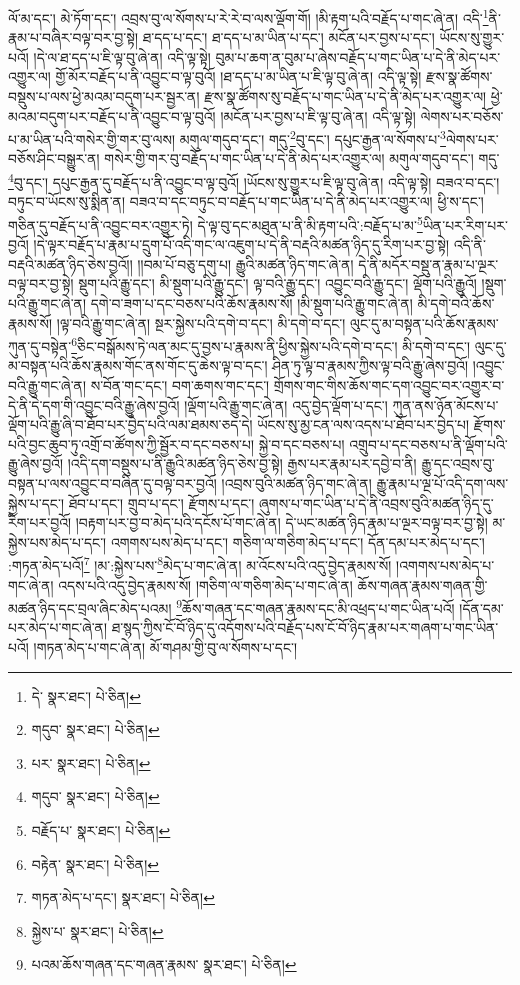 ལོ་མ་དང་། མེ་ཏོག་དང་། འབྲས་བུ་ལ་སོགས་པ་རེ་རེ་བ་ལས་ལྡོག་གོ། །མི་རྟག་པའི་བརྗོད་པ་གང་ཞེ་ན། འདི་\footnote{དེ་  སྣར་ཐང་།  པེ་ཅིན། }ནི་རྣམ་པ་བཞིར་བལྟ་བར་བྱ་སྟེ། ཐ་དད་པ་དང་། ཐ་དད་པ་མ་ཡིན་པ་དང་། མངོན་པར་བྱས་པ་དང་། ཡོངས་སུ་གྱུར་པའོ། །དེ་ལ་ཐ་དད་པ་ཇི་ལྟ་བུ་ཞེ་ན། འདི་ལྟ་སྟེ། བུམ་པ་ཆག་ན་བུམ་པ་ཞེས་བརྗོད་པ་གང་ཡིན་པ་དེ་ནི་མེད་པར་འགྱུར་ལ། གྱོ་མོར་བརྗོད་པ་ནི་འབྱུང་བ་ལྟ་བུའོ། །ཐ་དད་པ་མ་ཡིན་པ་ཇི་ལྟ་བུ་ཞེ་ན། འདི་ལྟ་སྟེ། རྫས་སྣ་ཚོགས་བསྡུས་པ་ལས་ཕྱེ་མའམ་བདུག་པར་སྦྱར་ན། རྫས་སྣ་ཚོགས་སུ་བརྗོད་པ་གང་ཡིན་པ་དེ་ནི་མེད་པར་འགྱུར་ལ། ཕྱེ་མའམ་བདུག་པར་བརྗོད་པ་ནི་འབྱུང་བ་ལྟ་བུའོ། །མངོན་པར་བྱས་པ་ཇི་ལྟ་བུ་ཞེ་ན། འདི་ལྟ་སྟེ། ལེགས་པར་བཅོས་པ་མ་ཡིན་པའི་གསེར་གྱི་གར་བུ་ལས། མགུལ་གདུབ་དང་། གདུ་\footnote{གདུབ་  སྣར་ཐང་།  པེ་ཅིན། }བུ་དང་། དཔུང་རྒྱན་ལ་སོགས་པ་\footnote{པར་  སྣར་ཐང་།  པེ་ཅིན། }ལེགས་པར་བཅོས་ཤིང་བསྒྱུར་ན། གསེར་གྱི་གར་བུ་བརྗོད་པ་གང་ཡིན་པ་དེ་ནི་མེད་པར་འགྱུར་ལ། མགུལ་གདུབ་དང་། གདུ་\footnote{གདུབ་  སྣར་ཐང་།  པེ་ཅིན། }བུ་དང་། དཔུང་རྒྱན་དུ་བརྗོད་པ་ནི་འབྱུང་བ་ལྟ་བུའོ། །ཡོངས་སུ་གྱུར་པ་ཇི་ལྟ་བུ་ཞེ་ན། འདི་ལྟ་སྟེ། བཟའ་བ་དང་། བཏུང་བ་ཡོངས་སུ་སྨིན་ན། བཟའ་བ་དང་བཏུང་བ་བརྗོད་པ་གང་ཡིན་པ་དེ་ནི་མེད་པར་འགྱུར་ལ། ཕྱི་ས་དང་། གཅིན་དུ་བརྗོད་པ་ནི་འབྱུང་བར་འགྱུར་ཏེ། དེ་ལྟ་བུ་དང་མཐུན་པ་ནི་མི་རྟག་པའི་:བརྗོད་པ་མ་\footnote{བརྗོད་པ་  སྣར་ཐང་།  པེ་ཅིན། }ཡིན་པར་རིག་པར་བྱའོ། །དེ་ལྟར་བརྗོད་པ་རྣམ་པ་དྲུག་པོ་འདི་གང་ལ་འཇུག་པ་དེ་ནི་བརྡའི་མཚན་ཉིད་དུ་རིག་པར་བྱ་སྟེ། འདི་ནི་བརྡའི་མཚན་ཉིད་ཅེས་བྱའོ།། །།བམ་པོ་བཅུ་དགུ་པ། རྒྱུའི་མཚན་ཉིད་གང་ཞེ་ན། དེ་ནི་མདོར་བསྡུ་ན་རྣམ་པ་ལྔར་བལྟ་བར་བྱ་སྟེ། སྡུག་པའི་རྒྱུ་དང་། མི་སྡུག་པའི་རྒྱུ་དང་། ལྟ་བའི་རྒྱུ་དང་། འབྱུང་བའི་རྒྱུ་དང་། ལྡོག་པའི་རྒྱུའོ། །སྡུག་པའི་རྒྱུ་གང་ཞེ་ན། དགེ་བ་ཟག་པ་དང་བཅས་པའི་ཆོས་རྣམས་སོ། །མི་སྡུག་པའི་རྒྱུ་གང་ཞེ་ན། མི་དགེ་བའི་ཆོས་རྣམས་སོ། །ལྟ་བའི་རྒྱུ་གང་ཞེ་ན། སྔར་སྐྱེས་པའི་དགེ་བ་དང་། མི་དགེ་བ་དང་། ལུང་དུ་མ་བསྟན་པའི་ཆོས་རྣམས་ཀུན་དུ་བསྟེན་\footnote{བརྟེན་  སྣར་ཐང་།  པེ་ཅིན། }ཅིང་བསྒོམས་ཏེ་ལན་མང་དུ་བྱས་པ་རྣམས་ནི་ཕྱིས་སྐྱེས་པའི་དགེ་བ་དང་། མི་དགེ་བ་དང་། ལུང་དུ་མ་བསྟན་པའི་ཆོས་རྣམས་གོང་ནས་གོང་དུ་ཆེས་ལྟ་བ་དང་། ཤིན་ཏུ་ལྟ་བ་རྣམས་ཀྱིས་ལྟ་བའི་རྒྱུ་ཞེས་བྱའོ། །འབྱུང་བའི་རྒྱུ་གང་ཞེ་ན། ས་བོན་གང་དང་། བག་ཆགས་གང་དང་། གྲོགས་གང་གིས་ཆོས་གང་དག་འབྱུང་བར་འགྱུར་བ་དེ་ནི་དེ་དག་གི་འབྱུང་བའི་རྒྱུ་ཞེས་བྱའོ། །ལྡོག་པའི་རྒྱུ་གང་ཞེ་ན། འདུ་བྱེད་ལྡོག་པ་དང་། ཀུན་ནས་ཉོན་མོངས་པ་ལྡོག་པའི་རྒྱུ་ཞི་བ་ཐོབ་པར་བྱེད་པའི་ལམ་ཐམས་ཅད་དེ། ཡོངས་སུ་མྱ་ངན་ལས་འདས་པ་ཐོབ་པར་བྱེད་པ། རྫོགས་པའི་བྱང་ཆུབ་ཏུ་འགྲོ་བ་ཚོགས་ཀྱི་སྦྱོར་བ་དང་བཅས་པ། སྐྱེ་བ་དང་བཅས་པ། འགྲུབ་པ་དང་བཅས་པ་ནི་ལྡོག་པའི་རྒྱུ་ཞེས་བྱའོ། །འདི་དག་བསྡུས་པ་ནི་རྒྱུའི་མཚན་ཉིད་ཅེས་བྱ་སྟེ། རྒྱས་པར་རྣམ་པར་དབྱེ་བ་ནི། རྒྱུ་དང་འབྲས་བུ་བསྟན་པ་ལས་འབྱུང་བ་བཞིན་དུ་བལྟ་བར་བྱའོ། །འབྲས་བུའི་མཚན་ཉིད་གང་ཞེ་ན། རྒྱུ་རྣམ་པ་ལྔ་པོ་འདི་དག་ལས་སྐྱེས་པ་དང་། ཐོབ་པ་དང་། གྲུབ་པ་དང་། རྫོགས་པ་དང་། ཞུགས་པ་གང་ཡིན་པ་དེ་ནི་འབྲས་བུའི་མཚན་ཉིད་དུ་རིག་པར་བྱའོ། །བརྟག་པར་བྱ་བ་མེད་པའི་དངོས་པོ་གང་ཞེ་ན། དེ་ཡང་མཚན་ཉིད་རྣམ་པ་ལྔར་བལྟ་བར་བྱ་སྟེ། མ་སྐྱེས་པས་མེད་པ་དང་། འགགས་པས་མེད་པ་དང་། གཅིག་ལ་གཅིག་མེད་པ་དང་། དོན་དམ་པར་མེད་པ་དང་། :གཏན་མེད་པའོ།\footnote{གཏན་མེད་པ་དང་།  སྣར་ཐང་།  པེ་ཅིན། } །མ་:སྐྱེས་པས་\footnote{སྐྱེས་པ་  སྣར་ཐང་།  པེ་ཅིན། }མེད་པ་གང་ཞེ་ན། མ་འོངས་པའི་འདུ་བྱེད་རྣམས་སོ། །འགགས་པས་མེད་པ་གང་ཞེ་ན། འདས་པའི་འདུ་བྱེད་རྣམས་སོ། །གཅིག་ལ་གཅིག་མེད་པ་གང་ཞེ་ན། ཆོས་གཞན་རྣམས་གཞན་གྱི་མཚན་ཉིད་དང་བྲལ་ཞིང་མེད་པའམ། \footnote{པའམ་ཆོས་གཞན་དང་གཞན་རྣམས་  སྣར་ཐང་།  པེ་ཅིན། }ཆོས་གཞན་དང་གཞན་རྣམས་དང་མི་འཕྲད་པ་གང་ཡིན་པའོ། །དོན་དམ་པར་མེད་པ་གང་ཞེ་ན། ཐ་སྙད་ཀྱིས་ངོ་བོ་ཉིད་དུ་འདོགས་པའི་བརྗོད་པས་ངོ་བོ་ཉིད་རྣམ་པར་གཞག་པ་གང་ཡིན་པའོ། །གཏན་མེད་པ་གང་ཞེ་ན། མོ་གཤམ་གྱི་བུ་ལ་སོགས་པ་དང་། 
